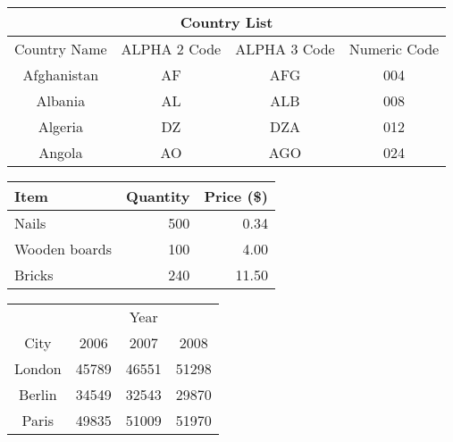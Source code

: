 \documentclass[a4paper,12pt]{report}
\begin{document}
\begin{tabular}{|c|c|c|c|}
\hline
\multicolumn{4}{|c|}{Country List}\\
\hline
Country Name & ALPHA 2 Code & ALPHA 3 Code & Numeric Code\\
\hline
Afghanistan & AF & AFG & 004\\
Albania & AL & ALB & 008\\
Algeria & DZ & DZA & 012\\
Angola & AO & AGO & 024\\
\hline
\end{tabular}

\newpage

\begin{tabular}{l|r|r}
Item & Quantity & Price (\$)\\
\hline
Nails & 500 & 0.34\\
Wooden boards & 100 & 4.00\\
Bricks & 240 & 11.50\\
\end{tabular}

\begin{tabular}{c|ccc}
	& \multicolumn{3}{c}{Year}\\
\cline{2-4}
City & 2006 & 2007 & 2008\\
\hline
London & 45789 & 46551 & 51298\\
Berlin & 34549 & 32543 & 29870\\
Paris & 49835 & 51009 & 51970\\
\end{tabular}
\end{document}
